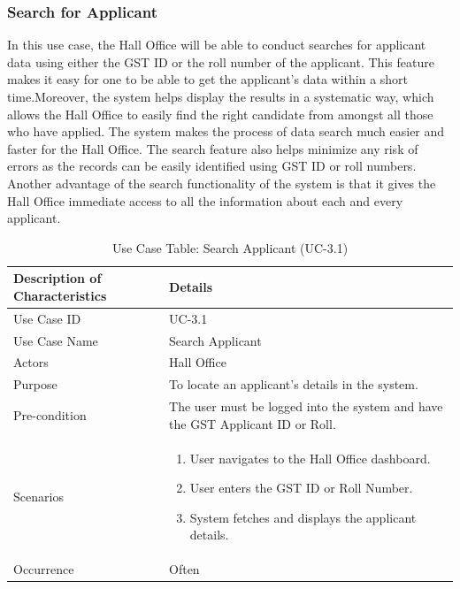 \subsubsection{Search for Applicant}

In this use case, the Hall Office will be able to conduct searches for applicant data using either the GST ID or the roll number of the applicant. This feature makes it easy for one to be able to get the applicant's data within a short time.Moreover, the system helps display the results in a systematic way, which allows the Hall Office to easily find the right candidate from amongst all those who have applied. The system makes the process of data search much easier and faster for the Hall Office. The search feature also helps minimize any risk of errors as the records can be easily identified using GST ID or roll numbers. Another advantage of the search functionality of the system is that it gives the Hall Office immediate access to all the information about each and every applicant.

\begin{table}[H]
    \centering
    \small
    \renewcommand{\arraystretch}{1.4} 
    \caption{Use Case Table: Search Applicant (UC-3.1)} %
    \label{tab:search-applicant}
    \begin{tabularx}{\textwidth}{|l|X|}
        \hline
        \rowcolor[gray]{0.9} {Description of Characteristics} & {Details} \\ \hline
        Use Case ID & UC-3.1 \\ \hline
        Use Case Name & Search Applicant \\ \hline
        Actors & Hall Office \\ \hline
        Purpose & To locate an applicant’s details in the system. \\ \hline
        Pre-condition & The user must be logged into the system and have the GST Applicant ID or Roll. \\ \hline
        Scenarios & 
        \begin{enumerate}[nosep, leftmargin=*, after=\vspace{-\baselineskip}, before=\vspace{-0.5\baselineskip}]
            \item User navigates to the Hall Office dashboard.
            \item User enters the GST ID or Roll Number.
            \item System fetches and displays the applicant details.
        \end{enumerate} \\ \hline
        Occurrence & Often \\ \hline
    \end{tabularx}
\end{table}
\FloatBarrier